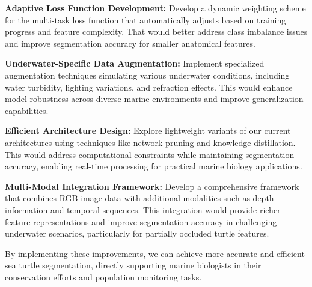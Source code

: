 \documentclass[conference]{IEEEtran}
\begin{document}
\textbf{Adaptive Loss Function Development:} Develop a dynamic weighting scheme for the multi-task loss function that automatically adjusts based on training progress and feature complexity. That would better address class imbalance issues and improve segmentation accuracy for smaller anatomical features.

\textbf{Underwater-Specific Data Augmentation:} Implement specialized augmentation techniques simulating various underwater conditions, including water turbidity, lighting variations, and refraction effects. This would enhance model robustness across diverse marine environments and improve generalization capabilities.

\textbf{Efficient Architecture Design:} Explore lightweight variants of our current architectures using techniques like network pruning and knowledge distillation. This would address computational constraints while maintaining segmentation accuracy, enabling real-time processing for practical marine biology applications.

\textbf{Multi-Modal Integration Framework:} Develop a comprehensive framework that combines RGB image data with additional modalities such as depth information and temporal sequences. This integration would provide richer feature representations and improve segmentation accuracy in challenging underwater scenarios, particularly for partially occluded turtle features.
 
By implementing these improvements, we can achieve more accurate and efficient sea turtle segmentation, directly supporting marine biologists in their conservation efforts and population monitoring tasks.
\small
\printbibliography
\nocite{*}
\normalsize
\end{document}
